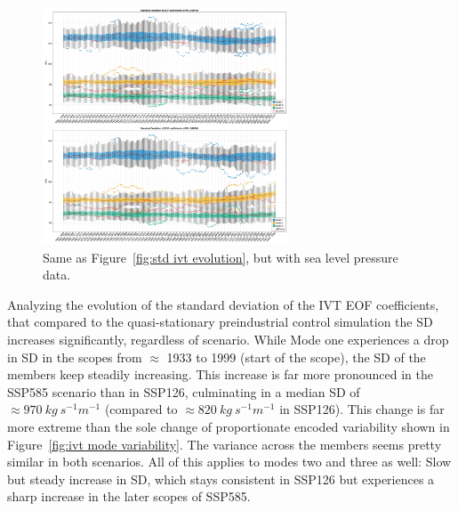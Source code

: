 \begin{figure}[htb]
  \begin{center}
    \includegraphics[width=0.65\textwidth]{figures/std_psl_50seasons_tempmodescale_3modes.png}
  \end{center}
  \caption{Same as Figure~\ref{fig:std ivt evolution}, but with sea level pressure data.}
  \label{fig:std psl evolution}
\end{figure}

Analyzing the evolution of the standard deviation of the IVT EOF coefficients, that compared to the quasi-stationary preindustrial control simulation the SD increases significantly, regardless of scenario. 
While Mode one experiences a drop in SD in the scopes from $\approx$ 1933 to 1999 (start of the scope), the SD of the members keep steadily increasing. 
This increase is far more pronounced in the SSP585 scenario than in SSP126, culminating in a median SD of $\approx 970~kg~s^{-1} m^{-1}$ (compared to $\approx 820~kg~s^{-1}m^{-1}$ in SSP126). 
This change is far more extreme than the sole change of proportionate encoded variability shown in Figure~\ref{fig:ivt mode variability}. 
The variance across the members seems pretty similar in both scenarios. 
All of this applies to modes two and three as well: Slow but steady increase in SD, which stays consistent in SSP126 but experiences a sharp increase in the later scopes of SSP585.  



